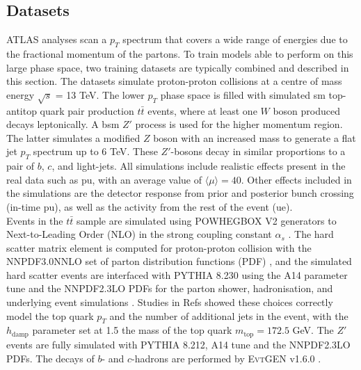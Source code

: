 \subsection{Datasets}\label{ftagdatasets}
ATLAS analyses scan a $p_T$ spectrum that covers a wide range of energies due to the fractional momentum of the partons. To train models able to perform on this large phase space, two training datasets are typically combined and described in this section. The datasets simulate proton-proton collisions at a centre of mass energy $\sqrt{s}$ = 13 TeV. The lower $p_T$ phase space is filled with simulated \gls{sm} top-antitop quark pair production $t\bar{t}$ events, where at least one $W$ boson produced decays leptonically. A \gls{bsm} $Z'$ process is used for the higher momentum region. The latter simulates a modified $Z$ boson with an increased mass to generate a flat jet $p_T$ spectrum up to 6 TeV. These $Z'$-bosons decay in similar proportions to a pair of $b$, $c$, and light-jets. All simulations include realistic effects present in the real data such as \gls{pu}, with an average value of $ \langle\mu\rangle = 40$. Other effects included in the simulations are the detector response from prior and posterior bunch crossing (in-time \gls{pu}), as well as the activity from the rest of the event (\gls{ue}). \\

Events in the $t\bar{t}$ sample are simulated using \textsc{POWHEGBOX V2} generators to Next-to-Leading Order (NLO) in the strong coupling constant $\alpha_s$ \cite{PaoloNason_2004, StefanoFrixione_2007, StefanoFrixione_20072, POWHEGBOX}. The hard scatter matrix element is computed for proton-proton collision with the \textsc{NNPDF3.0NNLO} set of parton distribution functions (PDF) \cite{PDFLHCrun2}, and the simulated hard scatter events are interfaced with \textsc{PYTHIA 8.230} \cite{SJOSTRAND2015159} using the A14 parameter tune \cite{ATL-PHYS-PUB-2014-021} and the \textsc{NNPDF2.3LO} PDFs for the parton shower, hadronisation, and underlying event simulations \cite{BALL2013244}. Studies in Refs \cite{ATL-PHYS-PUB-2016-020, ATL-PHYS-PUB-2020-023} showed these choices correctly model the top quark $p_T$ and the number of additional jets in the event, with the $h_{\textrm{damp}}$ parameter set at 1.5 the mass of the top quark $m_{\textrm{top}} = 172.5$ GeV. The $Z'$ events are fully simulated with \textsc{PYTHIA 8.212}, A14 tune and the \textsc{NNPDF2.3LO} PDFs. The decays of $b$- and $c$-hadrons are performed by \textsc{EvtGEN} v1.6.0 \cite{LANGE2001152}. \\

